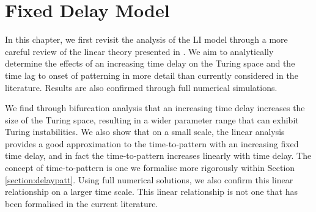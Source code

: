 \chapter{Fixed Delay Model}\label{section:fixdel}

In this chapter, we first revisit the analysis of the LI model through a more careful review of the linear theory presented in \cite{yigaffneyli,jiang}. We aim to analytically determine the effects of an increasing time delay on the Turing space and the time lag to onset of patterning in more detail than currently considered in the literature. Results are also confirmed through full numerical simulations.

We find through bifurcation analysis that an increasing time delay increases the size of the Turing space, resulting in a wider parameter range that can exhibit Turing instabilities. We also show that on a small scale, the linear analysis provides a good approximation to the time-to-pattern with an increasing fixed time delay, and in fact the time-to-pattern increases linearly with time delay. The concept of time-to-pattern is one we formalise more rigorously within Section \ref{section:delaypatt}. Using full numerical solutions, we also confirm this linear relationship on a larger time scale. This linear relationship is not one that has been formalised in the current literature.

